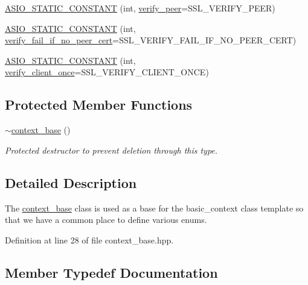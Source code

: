 \begin{DoxyCompactItemize}
\item 
\hyperlink{classasio_1_1ssl_1_1context__base_af743b6d02febac7773d28d9e10921525}{A\+S\+I\+O\+\_\+\+S\+T\+A\+T\+I\+C\+\_\+\+C\+O\+N\+S\+T\+A\+N\+T} (int, \hyperlink{namespaceasio_1_1ssl_ae71141f1eff86b35a2a2491501d55926}{verify\+\_\+peer}=S\+S\+L\+\_\+\+V\+E\+R\+I\+F\+Y\+\_\+\+P\+E\+E\+R)
\item 
\hyperlink{classasio_1_1ssl_1_1context__base_a59f3c5f613efbe169ee8027dcd3060b8}{A\+S\+I\+O\+\_\+\+S\+T\+A\+T\+I\+C\+\_\+\+C\+O\+N\+S\+T\+A\+N\+T} (int, \hyperlink{namespaceasio_1_1ssl_a7f69308747090e59be95a6c9b2497eb5}{verify\+\_\+fail\+\_\+if\+\_\+no\+\_\+peer\+\_\+cert}=S\+S\+L\+\_\+\+V\+E\+R\+I\+F\+Y\+\_\+\+F\+A\+I\+L\+\_\+\+I\+F\+\_\+\+N\+O\+\_\+\+P\+E\+E\+R\+\_\+\+C\+E\+R\+T)
\item 
\hyperlink{classasio_1_1ssl_1_1context__base_a61efdf9307d469644f4fdf5a931cdd39}{A\+S\+I\+O\+\_\+\+S\+T\+A\+T\+I\+C\+\_\+\+C\+O\+N\+S\+T\+A\+N\+T} (int, \hyperlink{namespaceasio_1_1ssl_af9dfada7a85d6a5bfb257eb5ad280ce7}{verify\+\_\+client\+\_\+once}=S\+S\+L\+\_\+\+V\+E\+R\+I\+F\+Y\+\_\+\+C\+L\+I\+E\+N\+T\+\_\+\+O\+N\+C\+E)
\end{DoxyCompactItemize}
\subsection*{Protected Member Functions}
\begin{DoxyCompactItemize}
\item 
\hyperlink{classasio_1_1ssl_1_1context__base_acac5be86a997ae43dfd1e78ad966cb61}{$\sim$context\+\_\+base} ()
\begin{DoxyCompactList}\small\item\em Protected destructor to prevent deletion through this type. \end{DoxyCompactList}\end{DoxyCompactItemize}


\subsection{Detailed Description}
The \hyperlink{classasio_1_1ssl_1_1context__base}{context\+\_\+base} class is used as a base for the basic\+\_\+context class template so that we have a common place to define various enums. 

Definition at line 28 of file context\+\_\+base.\+hpp.



\subsection{Member Typedef Documentation}
\hypertarget{classasio_1_1ssl_1_1context__base_a12d5d28abeb47c91311bf13740dec514}{}
